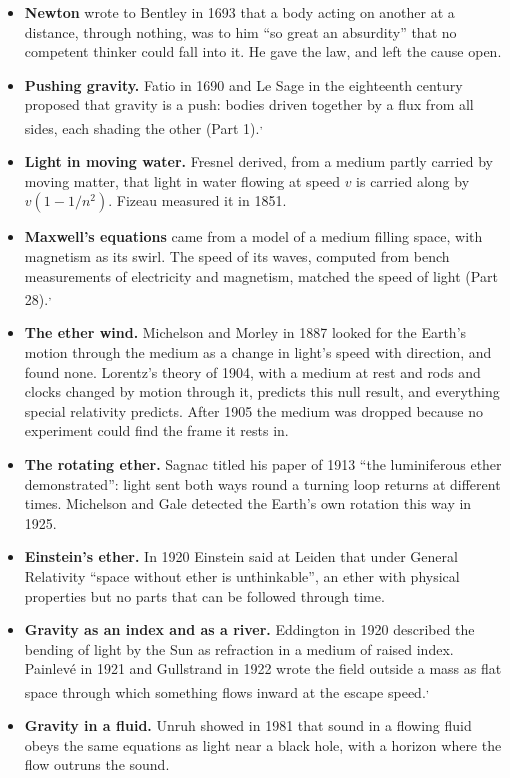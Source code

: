 \begin{itemize}
\item \textbf{Newton} wrote to Bentley in 1693 that a body acting on another at a distance, through nothing, was to him ``so great an absurdity'' that no competent thinker could fall into it. He gave the law, and left the cause open.
\item \textbf{Pushing gravity.} Fatio in 1690 and Le Sage in the eighteenth century proposed that gravity is a push: bodies driven together by a flux from all sides, each shading the other (Part 1).\textsuperscript{,}
\item \textbf{Light in moving water.} Fresnel derived, from a medium partly carried by moving matter, that light in water flowing at speed $v$ is carried along by $v(1-1/n^2)$. Fizeau measured it in 1851.
\item \textbf{Maxwell's equations} came from a model of a medium filling space, with magnetism as its swirl. The speed of its waves, computed from bench measurements of electricity and magnetism, matched the speed of light (Part 28).\textsuperscript{,}
\item \textbf{The ether wind.} Michelson and Morley in 1887 looked for the Earth's motion through the medium as a change in light's speed with direction, and found none. Lorentz's theory of 1904, with a medium at rest and rods and clocks changed by motion through it, predicts this null result, and everything special relativity predicts. After 1905 the medium was dropped because no experiment could find the frame it rests in.
\item \textbf{The rotating ether.} Sagnac titled his paper of 1913 ``the luminiferous ether demonstrated'': light sent both ways round a turning loop returns at different times. Michelson and Gale detected the Earth's own rotation this way in 1925.
\item \textbf{Einstein's ether.} In 1920 Einstein said at Leiden that under General Relativity ``space without ether is unthinkable'', an ether with physical properties but no parts that can be followed through time.
\item \textbf{Gravity as an index and as a river.} Eddington in 1920 described the bending of light by the Sun as refraction in a medium of raised index. Painlevé in 1921 and Gullstrand in 1922 wrote the field outside a mass as flat space through which something flows inward at the escape speed.\textsuperscript{,}
\item \textbf{Gravity in a fluid.} Unruh showed in 1981 that sound in a flowing fluid obeys the same equations as light near a black hole, with a horizon where the flow outruns the sound.
\end{itemize}

